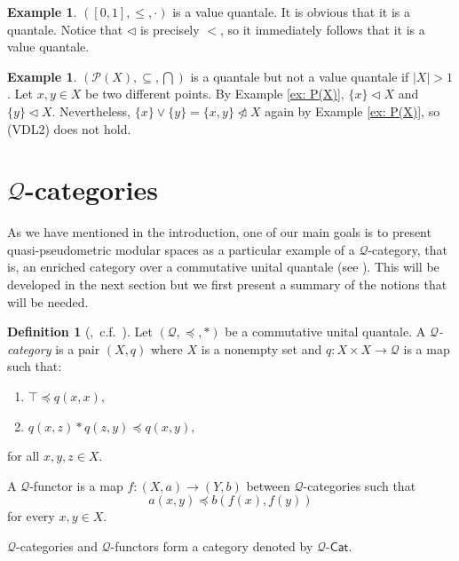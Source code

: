 \documentclass[11pt,a4paper]{amsart}
\theoremstyle{definition}
\newtheorem{definition}[theorem]{Definition}
\newtheorem{example}[theorem]{Example}
\begin{document}
	\begin{example}
		$([0,1],\leq,\cdot)$ is a value quantale. It is obvious that it is a quantale. Notice that $\lhd$ is precisely $<$, so it immediately follows that it is a value quantale.     
	\end{example}
	
	\begin{example}
		$(\mathcal{P}(X),\subseteq,\bigcap)$ is a quantale but not a value quantale if $|X|>1$. Let $x,y\in X$ be two different points. By Example \ref{ex: P(X)}, $\{x\}\lhd X$ and $\{y\}\lhd X$. Nevertheless, $\{x\}\vee \{y\}=\{x,y\}\ntriangleleft X$ again by Example \ref{ex: P(X)}, so  (VDL2) does not hold.
	\end{example}
	
	
	
	\section{$\mathscr{Q}$-categories}\label{sec:Qc}
	
	As we have mentioned in the introduction, one of our main goals is to present quasi-pseudometric modular spaces as a particular example of a $\mathscr{Q}$-category, that is, an enriched category over a commutative unital quantale (see \cite{BookEnrichedCategory,BookMonoidalTopology}). This will be developed in the next section but we first present a summary of the notions that will be needed.
	
	
	
	
	\begin{definition}[\mbox{\cite[Section III.1.3]{BookMonoidalTopology}, c.f. \cite[Definition 3.1]{FlaggKopp97}}]
		Let $(\mathscr{Q},\preceq,\ast)$ be a commutative unital quantale. A \emph{$\mathscr{Q}$-category} is a pair $(X,q)$ where $X$ is a nonempty set and $q:X\times X\to\mathscr{Q}$ is a map such that: 
		\begin{enumerate}[(QC1)]
			\item\label{QC: qxx} $\top\preceq q(x,x),$
			\item\label{QC: triangular} $q(x,z)*q(z,y)\preceq q(x,y),$
		\end{enumerate}
		for all $x,y,z\in X.$
		
		\noindent  A $\mathscr{Q}$-functor is a map $f:(X,a)\to (Y,b)$ between $\mathscr{Q}$-categories such that
		$$a(x,y)\preceq b(f(x),f(y))$$
		for every $x,y\in X.$
		
		\noindent  $\mathscr{Q}$-categories and $\mathscr{Q}$-functors form a category denoted by $\mathscr{Q}$-$\mathsf{Cat}.$
	\end{definition}
	
\end{document}
